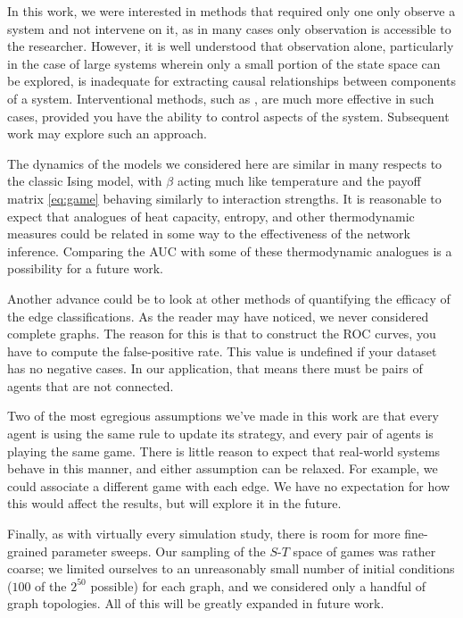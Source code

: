 \documentclass[letterpaper]{article}
\begin{document}
In this work, we were interested in methods that required only one only observe a system and not intervene on it, as in many cases only observation is accessible to the researcher. However, it is well understood that observation alone, particularly in the case of large systems wherein only a small portion of the state space can be explored, is inadequate for extracting causal relationships between components of a system. Interventional methods, such as \citep{Ay2008-jc}, are much more effective in such cases, provided you have the ability to control aspects of the system. Subsequent work may explore such an approach.

The dynamics of the models we considered here are similar in many respects to the classic Ising model, with $\beta$ acting much like temperature and the payoff matrix \cref{eq:game} behaving similarly to interaction strengths. It is reasonable to expect that analogues of heat capacity, entropy, and other thermodynamic measures could be related in some way to the effectiveness of the network inference. Comparing the AUC with some of these thermodynamic analogues is a possibility for a future work.

Another advance could be to look at other methods of quantifying the efficacy of the edge classifications. As the reader may have noticed, we never considered complete graphs. The reason for this is that to construct the ROC curves, you have to compute the false-positive rate. This value is undefined if your dataset has no negative cases. In our application, that means there must be pairs of agents that are not connected.

Two of the most egregious assumptions we've made in this work are that every agent is using the same rule to update its strategy, and every pair of agents is playing the same game. There is little reason to expect that real-world systems behave in this manner, and either assumption can be relaxed. For example, we could associate a different game with each edge. We have no expectation for how this would affect the results, but will explore it in the future.

Finally, as with virtually every simulation study, there is room for more fine-grained parameter sweeps. Our sampling of the $S$-$T$ space of games was rather coarse; we limited ourselves to an unreasonably small number of initial conditions ($100$ of the $2^{50}$ possible) for each graph, and we considered only a handful of graph topologies. All of this will be greatly expanded in future work.
\end{document}
